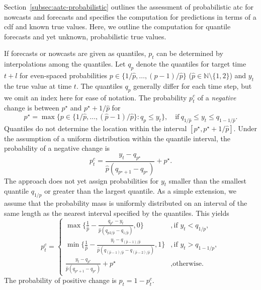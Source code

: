 \documentclass[pdflatex]{sn-jnl}
\theoremstyle{plain}%
\theoremstyle{definition}
\newcommand{\N}{\mathbb{N}}
\newcommand{\pmax}{\hat{p}} %
\newcommand{\pc}{p^c}
\begin{document}
Section~\ref{subsec:aatc-probabilistic} outlines the assessment of probabilistic \ac{atc} for nowcasts and forecasts and specifies the computation for predictions in terms of a \ac{cdf} and known true values.
Here, we outline the computation for quantile forecasts and yet unknown, probabilistic true values.

If forecasts or nowcasts are given as quantiles, $p_t$ can be determined by interpolations among the quantiles.
Let $q_p$ denote the quantiles for target time $t+l$ for even-spaced probabilities $p \in \{1/\pmax, \dots, (p-1) / \pmax\}$ ($\pmax \in \N \setminus \{1, 2\}$) and $y_t$ the true value at time $t$.
The quantiles $q_p$ generally differ for each time step, but we omit an index here for ease of notation.
The probability $\pc_t$ of a \textit{negative} change is between $p^{\star}$ and $p^{\star} + 1/\pmax$ for
\begin{equation*}
    p^{\star} = \max \{p \in \{1/\pmax, \dots, (\pmax-1) / \pmax\}: q_p \leq y_t\} , \quad \text{if}\ q_{1/\pmax} \leq y_t \leq q_{1 - 1/\pmax}.
\end{equation*}
Quantiles do not determine the location within the interval $[p^{\star}, p^{\star} + 1/\pmax]$.
Under the assumption of a uniform distribution within the quantile interval, the probability of a negative change is
\begin{equation*}
    \pc_t = \frac{y_t - q_{p^\star}}{\pmax (q_{p^{\star} + 1} - q_{p^{\star}})} + p^{\star}.
\end{equation*}
The approach does not yet assign probabilities for $y_t$ smaller than the smallest quantile $q_{1/p}$ or greater than the largest quantile.
As a simple extension, we assume that the probability mass is uniformly distributed on an interval of the same length as the nearest interval specified by the quantiles.
This yields
\begin{equation*}
\pc_t = \begin{cases}
    \max \{\frac{1}{\pmax} - \frac{q_{p^\star} - y_t}{\pmax (q_{p2/\pmax} - q_{1/\pmax})}, 0\} &, \text{if } y_t < q_{1/p}, \\
    \min \{\frac{1}{\pmax} - \frac{y_t - q_{(\pmax-1)/\pmax}}{\pmax (q_{(\pmax-1)/\pmax} - q_{(\pmax-2)/\pmax})}, 1\} &, \text{if } y_t > q_{1 - 1/p}, \\
    \frac{y_t - q_{p^\star}}{\pmax (q_{p^{\star} + 1} - q_{p^{\star}})} + p^{\star} &, \text{otherwise.}
\end{cases}
\end{equation*}
The probability of positive change is $p_t = 1 - \pc_t$.
\end{document}
